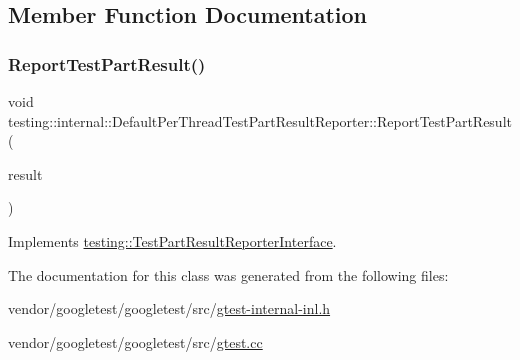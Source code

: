 \subsection{Member Function Documentation}
\mbox{\label{classtesting_1_1internal_1_1_default_per_thread_test_part_result_reporter_ac6dc08eadc4e5a2a64a91d0b6c6b3aad}} 
\subsubsection{\texorpdfstring{Report\+Test\+Part\+Result()}{ReportTestPartResult()}}
{\footnotesize\ttfamily void testing\+::internal\+::\+Default\+Per\+Thread\+Test\+Part\+Result\+Reporter\+::\+Report\+Test\+Part\+Result (\begin{DoxyParamCaption}\item[{const \hyperlink{classtesting_1_1_test_part_result}{Test\+Part\+Result} \&}]{result }\end{DoxyParamCaption})\hspace{0.3cm}{\ttfamily [virtual]}}



Implements \hyperlink{classtesting_1_1_test_part_result_reporter_interface_aa2f920e7a5a0a6d0faf19e3727928c22}{testing\+::\+Test\+Part\+Result\+Reporter\+Interface}.



The documentation for this class was generated from the following files\+:\begin{DoxyCompactItemize}
\item 
vendor/googletest/googletest/src/\hyperlink{gtest-internal-inl_8h}{gtest-\/internal-\/inl.\+h}\item 
vendor/googletest/googletest/src/\hyperlink{gtest_8cc}{gtest.\+cc}\end{DoxyCompactItemize}
